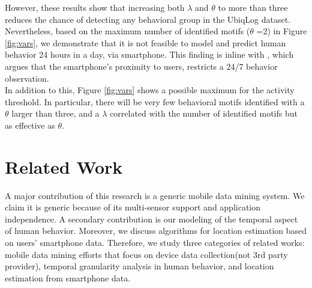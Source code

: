 \documentclass{sig-alternate}
\begin{document}
However, these results show that increasing both $\lambda$ and $\theta$ to more than three reduces the chance of detecting any behavioral group in the UbiqLog dataset. Nevertheless, based on the maximum number of identified motifs ($\theta$ =2) in Figure \ref{fig:vars}, we demonstrate that it is not feasible to model and predict human behavior 24 hours in a day, via smartphone. This finding is inline with \cite{gettingcloser}, which argues that the smartphone's proximity to users, restricts a 24/7 behavior observation.\\
In addition to this, Figure \ref{fig:vars} shows a possible maximum for the activity threshold. In particular, there will be very few behavioral motifs identified with a $\theta$ larger than three, and a $\lambda$ correlated with the number of identified motifs but as effective as $\theta$.
\vspace{-0.2cm}
\section{Related Work}
A major contribution of this research is a generic mobile data mining system. We claim it is generic because of its multi-sensor support and application independence. A secondary contribution is our modeling of the temporal aspect of human behavior. Moreover, we discuss algorithms for location estimation based on users' smartphone data. Therefore, we study three categories of related works: mobile data mining efforts that focus on device data collection(not 3rd party provider), temporal granularity analysis in human behavior, and location estimation from smartphone data. 
\vspace{-0.1cm}
\end{document}
